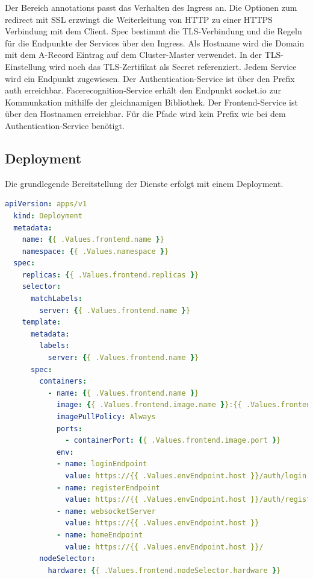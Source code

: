 Der Bereich annotations passt das Verhalten des Ingress an.
Die Optionen zum redirect mit SSL erzwingt die Weiterleitung von HTTP zu einer HTTPS Verbindung mit dem Client.
Spec bestimmt die TLS-Verbindung und die Regeln für die Endpunkte der Services über den Ingress.
Als Hostname wird die Domain mit dem A-Record Eintrag auf dem Cluster-Master verwendet.
In der TLS-Einstellung wird noch das TLS-Zertifikat als Secret referenziert.
Jedem Service wird ein Endpunkt zugewiesen.
Der Authentication-Service ist über den Prefix auth erreichbar.
Facerecognition-Service erhält den Endpunkt socket.io zur Kommunkation mithilfe der gleichnamigen Bibliothek.
Der Frontend-Service ist über den Hostnamen erreichbar.
Für die Pfade wird kein Prefix wie bei dem Authentication-Service benötigt.



\subsection{Deployment}

Die grundlegende Bereitstellung der Dienste erfolgt mit einem Deployment.

\begin{lstlisting}[caption={deployment.yaml },captionpos=b,label={lst:deploymentauth},language=yaml]
  apiVersion: apps/v1
  kind: Deployment
  metadata:
    name: {{ .Values.frontend.name }}
    namespace: {{ .Values.namespace }}
  spec:
    replicas: {{ .Values.frontend.replicas }}
    selector:
      matchLabels:
        server: {{ .Values.frontend.name }}
    template:
      metadata:
        labels:
          server: {{ .Values.frontend.name }}
      spec:
        containers:
          - name: {{ .Values.frontend.name }}
            image: {{ .Values.frontend.image.name }}:{{ .Values.frontend.image.tag }}
            imagePullPolicy: Always
            ports:
              - containerPort: {{ .Values.frontend.image.port }}
            env:
            - name: loginEndpoint
              value: https://{{ .Values.envEndpoint.host }}/auth/login
            - name: registerEndpoint
              value: https://{{ .Values.envEndpoint.host }}/auth/register
            - name: websocketServer
              value: https://{{ .Values.envEndpoint.host }}
            - name: homeEndpoint
              value: https://{{ .Values.envEndpoint.host }}/
        nodeSelector:
          hardware: {{ .Values.frontend.nodeSelector.hardware }}

\end{lstlisting}

